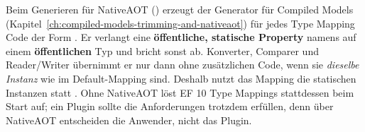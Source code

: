 \begin{important}
  Beim Generieren für NativeAOT () erzeugt
  der Generator für Compiled Models
  (Kapitel~\ref{ch:compiled-models-trimming-and-nativeaot}) für jedes Type Mapping Code der
  Form
  .
  Er verlangt eine \textbf{öffentliche, statische Property} namens  auf einem
  \textbf{öffentlichen} Typ und bricht sonst ab. Konverter, Comparer und Reader/Writer
  übernimmt er nur dann ohne zusätzlichen Code, wenn sie \emph{dieselbe Instanz} wie im Default-Mapping
  sind. Deshalb nutzt das Mapping die statischen Instanzen statt . Ohne NativeAOT löst EF 10 Type
  Mappings stattdessen beim Start auf; ein Plugin sollte die Anforderungen trotzdem
  erfüllen, denn über NativeAOT entscheiden die Anwender, nicht das Plugin.
\end{important}
